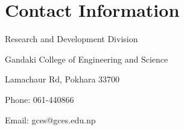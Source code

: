 \chapter*{Contact Information}
Research and Development Division

Gandaki College of Engineering and Science

Lamachaur Rd, Pokhara 33700

Phone: 061-440866

Email: gces@gces.edu.np